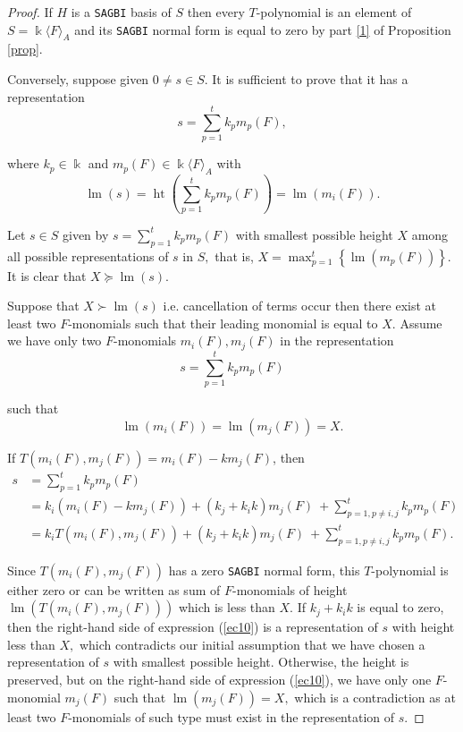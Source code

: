 \documentclass[10pt,a4paper]{amsart}
\begin{document}
\begin{proof}
If $H$ is a \texttt{SAGBI} basis of $S$ then every $T$-polynomial is an element of $S=\Bbbk\langle F\rangle_{A}$ and its \texttt{SAGBI} normal form is equal to zero by part \ref{1} of Proposition \ref{prop}.

Conversely, suppose given $0 \neq s \in S .$ It is sufficient to prove that it has a representation 
$$
s = \sum\limits_{p=1}^{t} k_{p} m_{p}(F),
$$ 

where $k_{p} \in \Bbbk$ and $m_{p}(F) \in \Bbbk\langle F\rangle_{A}$ with 
$$
\operatorname{lm}(s)=\operatorname{ht}\left(\sum\limits_{p=1}^{t} k_{p} m_{p}(F)\right)=\operatorname{lm}(m_i(F)).
$$

Let $s \in S$ given by $s = \sum\limits_{p=1}^{t} k_{p} m_{p}(F)$ with smallest possible height $X$ among all possible representations of $s$ in $S,$ that is, $X=\max _{p=1}^{t}\left\{\operatorname{lm}\left(m_{p}(F)\right)\right\}$. It is clear that $ X \succeq\operatorname{lm}(s)$.

Suppose that $X\succ\operatorname{lm}(s)$ i.e. cancellation of terms occur then there exist at least two $F$-monomials such that their leading monomial is equal to $X .$ Assume we have only two $F$-monomials $m_{i}(F), m_{j}(F)$ in the representation 
$$
s = \sum\limits_{p=1}^{t} k_{p} m_{p}(F)
$$ 

such that 
$$
\operatorname{lm}\left(m_{i}(F)\right)=\operatorname{lm}\left(m_{j}(F)\right)=X.
$$ 

If $T\left(m_{i}(F), m_{j}(F)\right)=m_{i}(F)-k m_{j}(F)$, then 
\begin{align}
s &=\sum_{p=1}^{t} k_{p} m_{p}(F) \\
&=k_{i}\left(m_{i}(F)-k m_{j}(F)\right) +\left(k_{j}+k_{i} k\right) m_{j}(F) \ +\sum_{p=1, p \neq i, j}^{t} k_{p} m_{p}(F)\\
&=k_{i} T\left(m_{i}(F), m_{j}(F)\right)+\left(k_{j}+k_{i} k\right) m_{j}(F) \ +\sum_{p=1, p \neq i, j}^{t} k_{p} m_{p}(F).\label{ec10}
\end{align}

Since $T\left(m_{i}(F), m_{j}(F)\right)$ has a zero \texttt{SAGBI} normal form, this $T$-polynomial is either zero or can be written as sum of $F$-monomials of height $\operatorname{lm}\left(T\left(m_{i}(F), m_{j}(F)\right)\right)$ which is less than $X .$ If $k_{j}+k_{i} k$ is equal to zero, then the right-hand side of expression (\ref{ec10}) is a representation of $s$ with height less than $X,$ which contradicts our initial assumption that we have chosen a representation of $s$ with smallest possible height. Otherwise, the height is preserved, but on the right-hand side of expression (\ref{ec10}), we have only one $F$-monomial $m_{j}(F)$ such that $\operatorname{lm}\left(m_{j}(F)\right)=X,$ which is a contradiction as at least two $F$-monomials of such type must exist in the representation of $s$.
\end{proof}
\end{document}
